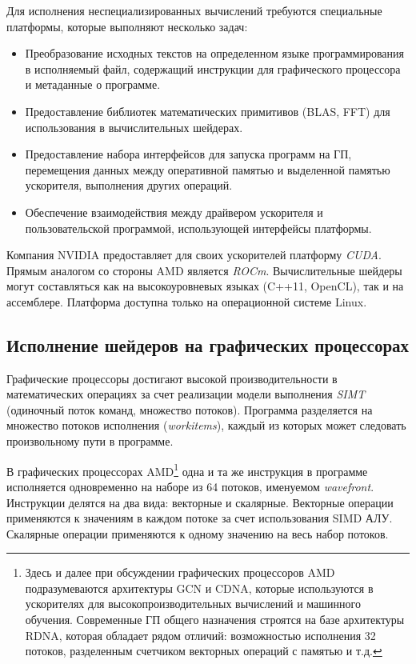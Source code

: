 \documentclass[a4paper,14pt]{extarticle}
\newenvironment{ul}{\begin{itemize}[noitemsep,topsep=0em]}{\end{itemize}\vspace{20pt}}
\begin{document}
Для исполнения неспециализированных вычислений требуются специальные платформы,
которые выполняют несколько задач:
\begin{ul}
\item Преобразование исходных текстов на определенном языке программирования
  в исполняемый файл, содержащий инструкции для графического процессора и метаданные о программе.
\item Предоставление библиотек математических примитивов (BLAS, FFT)
  для использования в вычислительных шейдерах.
\item Предоставление набора интерфейсов для запуска программ на ГП, перемещения данных между
  оперативной памятью и выделенной памятью ускорителя, выполнения других операций.
\item Обеспечение взаимодействия между драйвером ускорителя и пользовательской программой,
  использующей интерфейсы платформы.
\end{ul}

Компания NVIDIA предоставляет для своих ускорителей платформу \textit{CUDA}. Прямым аналогом
со стороны AMD является \textit{ROCm}. Вычислительные шейдеры могут составляться как
на высокоуровневых языках (C++11, OpenCL), так и на ассемблере. Платформа доступна
только на операционной системе Linux.

\subsection{Исполнение шейдеров на графических процессорах}

Графические процессоры достигают высокой производительности в математических операциях
за счет реализации модели выполнения \textit{SIMT} (одиночный поток команд, множество потоков).
Программа разделяется на множество потоков исполнения (\textit{workitems}),
каждый из которых может следовать произвольному пути в программе.

В графических процессорах AMD\footnote{Здесь и далее при обсуждении графических процессоров AMD
подразумеваются архитектуры GCN и CDNA, которые используются в ускорителях для высокопроизводительных
вычислений и машинного обучения. Современные ГП общего назначения строятся на базе архитектуры RDNA,
которая обладает рядом отличий: возможностью исполнения 32 потоков, разделенным счетчиком векторных
операций с памятью и т.д.}
одна и та же инструкция в программе исполняется одновременно на наборе из 64 потоков,
именуемом \textit{wavefront}. Инструкции делятся на два вида: векторные и скалярные.
Векторные операции применяются к значениям в каждом потоке за счет использования SIMD АЛУ.
Скалярные операции применяются к одному значению на весь набор потоков.
\end{document}

